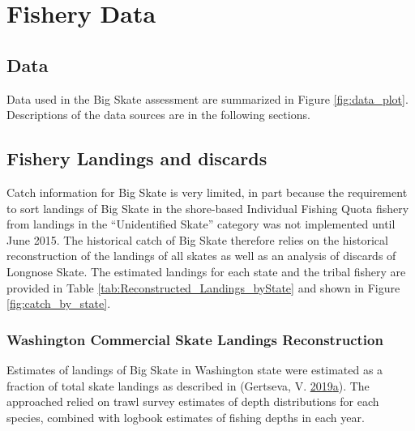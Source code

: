 \documentclass[12pt,]{article}
\begin{document}
\FloatBarrier

\newpage
\renewcommand{\thefigure}{\arabic{figure}}
\renewcommand{\thetable}{\arabic{table}}
\setcounter{figure}{0}
\setcounter{table}{0}

\newpage
\renewcommand{\thefigure}{\arabic{figure}}
\renewcommand{\thetable}{\arabic{table}}
\setcounter{figure}{0}
\setcounter{table}{0}

\newpage

\hypertarget{fishery-data}{%
\section{Fishery Data}\label{fishery-data}}

\hypertarget{data}{%
\subsection{Data}\label{data}}

Data used in the Big Skate assessment are summarized in Figure
\ref{fig:data_plot}. Descriptions of the data sources are in the
following sections.

\hypertarget{fishery-landings-and-discards}{%
\subsection{Fishery Landings and
discards}\label{fishery-landings-and-discards}}

Catch information for Big Skate is very limited, in part because the
requirement to sort landings of Big Skate in the shore-based Individual
Fishing Quota fishery from landings in the ``Unidentified Skate''
category was not implemented until June 2015. The historical catch of
Big Skate therefore relies on the historical reconstruction of the
landings of all skates as well as an analysis of discards of Longnose
Skate. The estimated landings for each state and the tribal fishery are
provided in Table \ref{tab:Reconstructed_Landings_byState} and shown in
Figure \ref{fig:catch_by_state}.

\hypertarget{washington-commercial-skate-landings-reconstruction}{%
\subsubsection{Washington Commercial Skate Landings
Reconstruction}\label{washington-commercial-skate-landings-reconstruction}}

Estimates of landings of Big Skate in Washington state were estimated as
a fraction of total skate landings as described in (Gertseva, V.
\protect\hyperlink{ref-Gertseva2019}{2019}\protect\hyperlink{ref-Gertseva2019}{a}).
The approached relied on trawl survey estimates of depth distributions
for each species, combined with logbook estimates of fishing depths in
each year.
\end{document}
